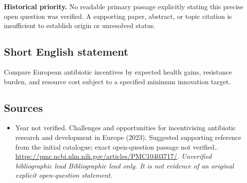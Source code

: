 \documentclass[11pt]{article}
\begin{document}
\par\textbf{Historical priority.} No readable primary passage explicitly stating this precise open question was verified. A supporting paper, abstract, or topic citation is insufficient to establish origin or unresolved status.

\subsection{Short English statement}
Compare European antibiotic incentives by expected health gains, resistance burden, and resource cost subject to a specified minimum innovation target.

\subsection{Sources}
\begin{itemize}\raggedright
\item[\textnormal{[S1]}]\hypertarget{source:30007728:1}{} Year not verified. Challenges and opportunities for incentivising antibiotic research and development in Europe (2023). Suggested supporting reference from the initial catalogue; exact open-question passage not verified..
\url{https://pmc.ncbi.nlm.nih.gov/articles/PMC10403717/}.
{\small\textit{Unverified bibliographic lead Bibliographic lead only. It is not evidence of an original explicit open-question statement.}}
\end{itemize}
\end{document}
